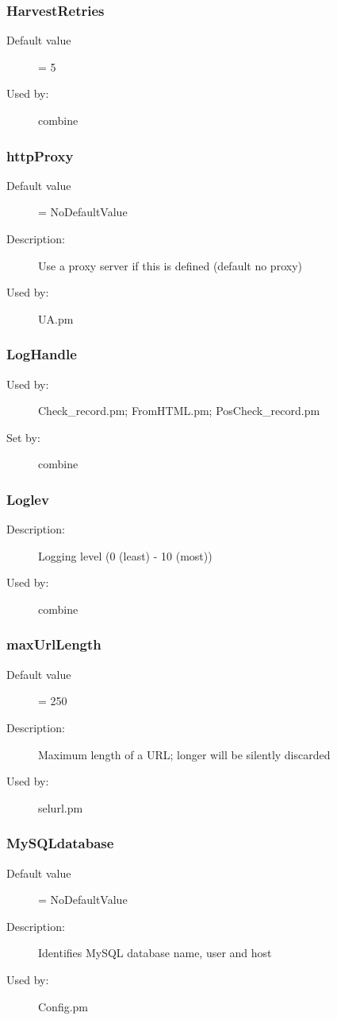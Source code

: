 \subsubsection{HarvestRetries}
\label{HarvestRetries}
\begin{description}
\item[Default value] = 5
\item[Used by:] combine
\end{description}
\subsubsection{httpProxy}
\label{httpProxy}
\begin{description}
\item[Default value] = NoDefaultValue
\item[Description:] Use a proxy server if this is defined (default no proxy)
\item[Used by:] UA.pm
\end{description}
\subsubsection{LogHandle}
\label{LogHandle}
\begin{description}
\item[Used by:] Check\_record.pm; FromHTML.pm; PosCheck\_record.pm
\item[Set by:] combine
\end{description}
\subsubsection{Loglev}
\label{Loglev}
\begin{description}
\item[Description:] Logging level (0 (least) - 10 (most))
\item[Used by:] combine
\end{description}
\subsubsection{maxUrlLength}
\label{maxUrlLength}
\begin{description}
\item[Default value] = 250
\item[Description:] Maximum length of a URL; longer will be silently discarded
\item[Used by:] selurl.pm
\end{description}
\subsubsection{MySQLdatabase}
\label{MySQLdatabase}
\begin{description}
\item[Default value] = NoDefaultValue
\item[Description:] Identifies MySQL database name, user and host
\item[Used by:] Config.pm
\end{description}
